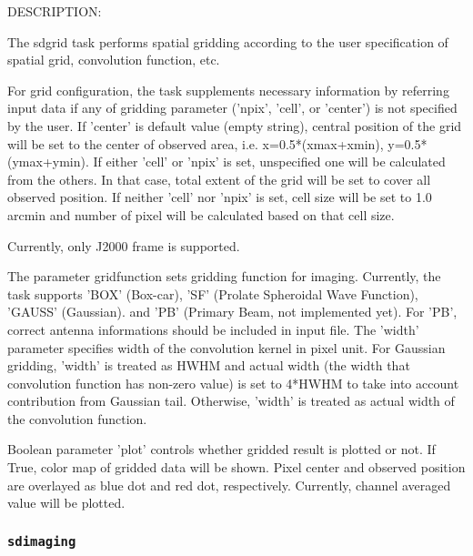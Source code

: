 DESCRIPTION:

The sdgrid task performs spatial gridding according to the user 
specification of spatial grid, convolution function, etc.

For grid configuration, the task supplements necessary information 
by referring input data if any of gridding parameter ('npix', 
'cell', or 'center') is not specified by the user. If 'center' is 
default value (empty string), central position of the grid will be 
set to the center of observed area, i.e. x=0.5*(xmax+xmin), 
y=0.5*(ymax+ymin). If either 'cell' or 'npix' is set, unspecified 
one will be calculated from the others. In that case, total extent of 
the grid will be set to cover all observed position. If neither 'cell' 
nor 'npix' is set, cell size will be set to 1.0 arcmin and number of 
pixel will be calculated based on that cell size.
 
Currently, only J2000 frame is supported.
 
The parameter gridfunction sets gridding function for imaging. 
Currently, the task supports 'BOX' (Box-car), 'SF' (Prolate 
Spheroidal Wave Function), 'GAUSS' (Gaussian). and 'PB' 
(Primary Beam, not implemented yet). For 'PB', correct 
antenna informations should be included in input file. 
The 'width' parameter specifies width of the convolution kernel 
in pixel unit. For Gaussian gridding, 'width' is treated as HWHM 
and actual width (the width that convolution function has non-zero 
value) is set to 4*HWHM to take into account contribution from 
Gaussian tail. Otherwise, 'width' is treated as actual width of the 
convolution function. 

Boolean parameter 'plot' controls whether gridded result is plotted 
or not. If True, color map of gridded data will be shown. Pixel 
center and observed position are overlayed as blue dot and red dot, 
respectively. Currently, channel averaged value will be plotted.



\subsubsection{{\tt sdimaging}}
\label{section:sd.sdtasks.tasks.sdimaging}


